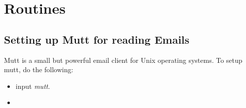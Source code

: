 
\section{Routines}

\subsection{Setting up Mutt for reading Emails}
Mutt \cite{mutt} is a small but powerful email client for Unix operating systems. To setup mutt, do the following:
\begin{itemize}
\item input \emph{mutt}.
\item 
\end{itemize} 
